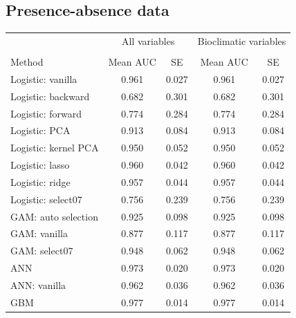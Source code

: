\begin{figure}[!htb]
\center
{}
\end{figure}


\subsection{Presence-absence data}

\begin{table}[!htb]
\center
\begin{tabular}{lcccc}
 & \multicolumn{2}{c}{All variables} & \multicolumn{2}{c}{Bioclimatic variables}\\
\cline{2-3} \cline{4-5} \\
Method & Mean AUC & SE & Mean AUC & SE \\
\midrule
Logistic: vanilla    & 0.961 & 0.027 & 0.961& 0.027 \\
Logistic: backward   & 0.682 & 0.301 & 0.682& 0.301 \\
Logistic: forward    & 0.774 & 0.284 & 0.774& 0.284 \\
Logistic: PCA        & 0.913 & 0.084 & 0.913& 0.084 \\
Logistic: kernel PCA & 0.950 & 0.052 & 0.950& 0.052 \\
Logistic: lasso      & 0.960 & 0.042 & 0.960& 0.042 \\
Logistic: ridge      & 0.957 & 0.044 & 0.957& 0.044 \\
Logistic: select07   & 0.756 & 0.239 & 0.756& 0.239 \\
GAM: auto selection  & 0.925 & 0.098 & 0.925& 0.098 \\
GAM: vanilla         & 0.877 & 0.117 & 0.877& 0.117 \\
GAM: select07        & 0.948 & 0.062 & 0.948& 0.062 \\
ANN                  & 0.973 & 0.020 & 0.973& 0.020 \\
ANN: vanilla         & 0.962 & 0.036 & 0.962& 0.036 \\
GBM                  & 0.977 & 0.014 & 0.977& 0.014 \\
\bottomrule

\end{tabular}
\end{table}





